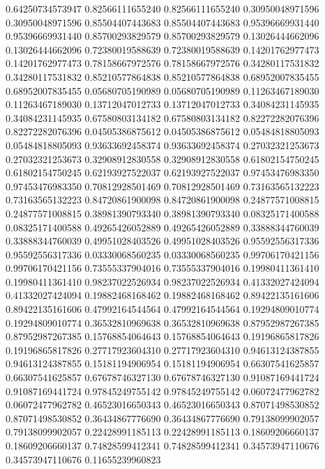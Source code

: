    0.64250734573947   0.82566111655240
   0.82566111655240   0.30950048971596
   0.30950048971596   0.85504407443683
   0.85504407443683   0.95396669931440
   0.95396669931440   0.85700293829579
   0.85700293829579   0.13026444662096
   0.13026444662096   0.72380019588639
   0.72380019588639   0.14201762977473
   0.14201762977473   0.78158667972576
   0.78158667972576   0.34280117531832
   0.34280117531832   0.85210577864838
   0.85210577864838   0.68952007835455
   0.68952007835455   0.05680705190989
   0.05680705190989   0.11263467189030
   0.11263467189030   0.13712047012733
   0.13712047012733   0.34084231145935
   0.34084231145935   0.67580803134182
   0.67580803134182   0.82272282076396
   0.82272282076396   0.04505386875612
   0.04505386875612   0.05484818805093
   0.05484818805093   0.93633692458374
   0.93633692458374   0.27032321253673
   0.27032321253673   0.32908912830558
   0.32908912830558   0.61802154750245
   0.61802154750245   0.62193927522037
   0.62193927522037   0.97453476983350
   0.97453476983350   0.70812928501469
   0.70812928501469   0.73163565132223
   0.73163565132223   0.84720861900098
   0.84720861900098   0.24877571008815
   0.24877571008815   0.38981390793340
   0.38981390793340   0.08325171400588
   0.08325171400588   0.49265426052889
   0.49265426052889   0.33888344760039
   0.33888344760039   0.49951028403526
   0.49951028403526   0.95592556317336
   0.95592556317336   0.03330068560235
   0.03330068560235   0.99706170421156
   0.99706170421156   0.73555337904016
   0.73555337904016   0.19980411361410
   0.19980411361410   0.98237022526934
   0.98237022526934   0.41332027424094
   0.41332027424094   0.19882468168462
   0.19882468168462   0.89422135161606
   0.89422135161606   0.47992164544564
   0.47992164544564   0.19294809010774
   0.19294809010774   0.36532810969638
   0.36532810969638   0.87952987267385
   0.87952987267385   0.15768854064643
   0.15768854064643   0.19196865817826
   0.19196865817826   0.27717923604310
   0.27717923604310   0.94613124387855
   0.94613124387855   0.15181194906954
   0.15181194906954   0.66307541625857
   0.66307541625857   0.67678746327130
   0.67678746327130   0.91087169441724
   0.91087169441724   0.97845249755142
   0.97845249755142   0.06072477962782
   0.06072477962782   0.46523016650343
   0.46523016650343   0.87071498530852
   0.87071498530852   0.36434867776690
   0.36434867776690   0.79138099902057
   0.79138099902057   0.22428991185113
   0.22428991185113   0.18609206660137
   0.18609206660137   0.74828599412341
   0.74828599412341   0.34573947110676
   0.34573947110676   0.11655239960823
